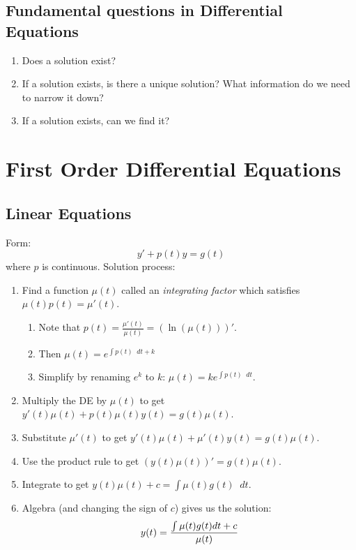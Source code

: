 \documentclass[12pt]{article}
\newcommand{\dd}{\mathop{}\!d}
\theoremstyle{definition}
\begin{document}
\subsection{Fundamental questions in Differential Equations}
\begin{enumerate}
	\item Does a solution exist?
	\item If a solution exists, is there a unique solution? What information do we need to narrow it down?
	\item If a solution exists, can we find it?
\end{enumerate}

\section{First Order Differential Equations}

\subsection{Linear Equations}
Form: \begin{equation*}
	y' + p(t)y = g(t)
\end{equation*}
where $p$ is continuous.
Solution process:
\begin{enumerate}
	\item Find a function $\mu(t)$ called an \textit{integrating factor} which satisfies $\mu(t)p(t)=\mu'(t)$.
	      \begin{enumerate}
		      \item Note that $p(t) = \frac{\mu'(t)}{\mu(t)} = (\ln(\mu(t)))'$.
		      \item Then $\mu(t) = e^{\int p(t) \dd t + k}$
		      \item Simplify by renaming $e^k$ to $k$: $\mu(t) = ke^{\int p(t) \dd t}$.
	      \end{enumerate}
	\item Multiply the DE by $\mu(t)$ to get $y'(t)\mu(t)+p(t)\mu(t)y(t) = g(t)\mu(t)$.
	\item Substitute $\mu'(t)$ to get $y'(t)\mu(t)+\mu'(t)y(t)=g(t)\mu(t)$.
	\item Use the product rule to get $(y(t)\mu(t))' = g(t)\mu(t)$.
	\item Integrate to get $y(t)\mu(t) + c = \int \mu(t)g(t) \dd t$.
	\item Algebra (and changing the sign of $c$) gives us the solution: \begin{equation*}
		      y(t) = \frac{\int\mu(t)g(t) \\d t + c}{\mu(t)}
	      \end{equation*}
\end{enumerate}
\end{document}
